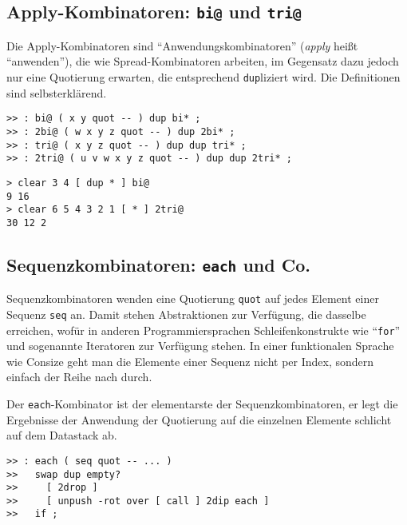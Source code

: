 \subsection{Apply-Kombinatoren: \texttt{bi@} und \texttt{tri@}}
\label{Sec:applyCombinators}

Die Apply-Kombinatoren sind "`Anwendungskombinatoren"' (\emph{apply} heißt "`anwenden"'), die wie Spread-Kombinatoren arbeiten, im Gegensatz dazu jedoch nur eine Quotierung erwarten, die entsprechend \verb|dup|liziert wird. Die Definitionen sind selbsterklärend. 

\begin{verbatim}
>> : bi@ ( x y quot -- ) dup bi* ;
>> : 2bi@ ( w x y z quot -- ) dup 2bi* ;
>> : tri@ ( x y z quot -- ) dup dup tri* ;
>> : 2tri@ ( u v w x y z quot -- ) dup dup 2tri* ;
\end{verbatim}

\begin{verbatim}
> clear 3 4 [ dup * ] bi@
9 16
> clear 6 5 4 3 2 1 [ * ] 2tri@
30 12 2
\end{verbatim}

\subsection{Sequenzkombinatoren: \texttt{each} und Co.}
\label{Sec:SequenceCombinators}

Sequenzkombinatoren wenden eine Quotierung \verb|quot| auf jedes Element einer Sequenz \verb|seq| an. Damit stehen Abstraktionen zur Verfügung, die dasselbe erreichen, wofür in anderen Programmiersprachen Schleifenkonstrukte wie "`\verb|for|"' und sogenannte Iteratoren zur Verfügung stehen. In einer funktionalen Sprache wie Consize geht man die Elemente einer Sequenz nicht per Index, sondern einfach der Reihe nach durch.

Der \verb|each|-Kombinator ist der elementarste der Sequenzkombinatoren, er legt die Ergebnisse der Anwendung der Quotierung auf die einzelnen Elemente schlicht auf dem Datastack ab.

\begin{verbatim}
>> : each ( seq quot -- ... )
>>   swap dup empty?
>>     [ 2drop ]
>>     [ unpush -rot over [ call ] 2dip each ]
>>   if ;
\end{verbatim}

